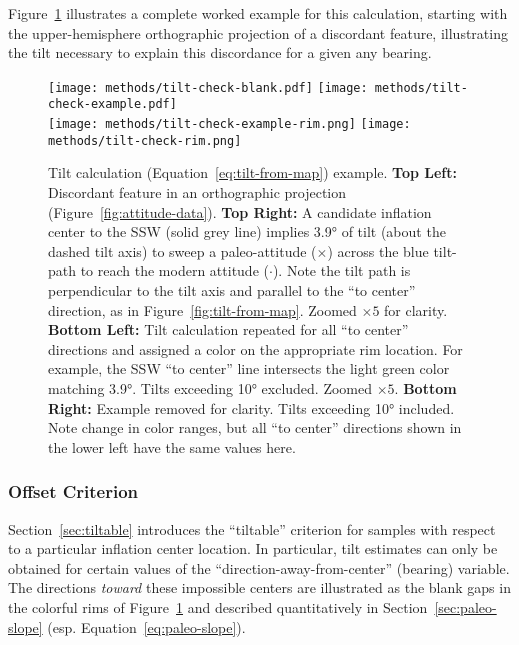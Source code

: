 Figure~\ref{fig:tilt-example} illustrates a complete worked example for this calculation, starting with the upper-hemisphere orthographic projection of a discordant feature, illustrating the tilt necessary to explain this discordance for a given any \acs{bearing}.
\begin{figure}
    \vspace{-19pt}
    \texttt{[image: methods/tilt-check-blank.pdf]}%
    \texttt{[image: methods/tilt-check-example.pdf]}\\
    \texttt{[image: methods/tilt-check-example-rim.png]}%
    \texttt{[image: methods/tilt-check-rim.png]}%
    \caption[Tilt calculation example]{Tilt calculation (Equation~\ref{eq:tilt-from-map}) example. \textbf{Top Left:} Discordant feature in an orthographic projection (Figure~\ref{fig:attitude-data}). \textbf{Top Right:} A candidate inflation center to the SSW (solid grey line) implies \ang{3.9} of tilt (about the dashed tilt axis) to sweep a paleo-attitude ($\times$) across the blue tilt-path to reach the modern attitude ($\cdot$). Note the tilt path is perpendicular to the tilt axis and parallel to the ``to center'' direction, as in Figure~\ref{fig:tilt-from-map}. Zoomed $\times5$ for clarity. \textbf{Bottom Left:} Tilt calculation repeated for all ``to center'' directions and assigned a color on the appropriate rim location. For example, the SSW ``to center'' line intersects the light green color matching \ang{3.9}. Tilts exceeding \ang{10} excluded. Zoomed $\times5$. \textbf{Bottom Right:} Example removed for clarity. Tilts exceeding \ang{10} included. Note change in color ranges, but all ``to center'' directions shown in the lower left have the same values here.}
    \label{fig:tilt-example}
\end{figure}

\subsubsection{Offset Criterion}\label{sec:offset}

Section~\ref{sec:tiltable} introduces the ``tiltable'' criterion for samples with respect to a particular inflation center location. In particular, tilt estimates can only be obtained for certain values of the ``direction-away-from-center'' (\acs{bearing}) variable. The directions \emph{toward} these impossible centers are illustrated as the blank gaps in the colorful rims of Figure~\ref{fig:tilt-example} and described quantitatively in Section~\ref{sec:paleo-slope} (esp. Equation~\ref{eq:paleo-slope}).

